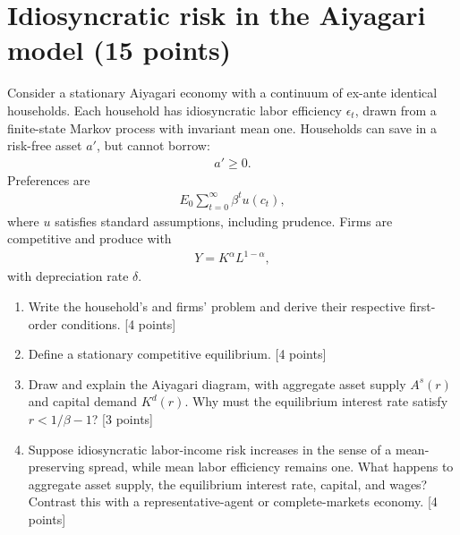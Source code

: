 \documentclass[11pt]{article}
\newcommand{\ben}{\begin{enumerate}}
\newcommand{\een}{\end{enumerate}}
\begin{document}
\section{Idiosyncratic risk in the Aiyagari model (15 points)}

Consider a stationary Aiyagari economy with a continuum of ex-ante identical households. Each household has idiosyncratic labor efficiency $\epsilon_t$, drawn from a finite-state Markov process with invariant mean one. Households can save in a risk-free asset $a'$, but cannot borrow:
\begin{eqnarray}
a'\geq 0.
\end{eqnarray}
Preferences are
\begin{eqnarray}
E_0\sum_{t=0}^{\infty}\beta^t u(c_t),
\end{eqnarray}
where $u$ satisfies standard assumptions, including prudence. Firms are competitive and produce with
\begin{eqnarray}
Y=K^\alpha L^{1-\alpha},
\end{eqnarray}
with depreciation rate $\delta$.

\ben
\item Write the household's and firms' problem and derive their respective first-order conditions. [4 points]

\item Define a stationary competitive equilibrium. [4 points]

\item Draw and explain the Aiyagari diagram, with aggregate asset supply $A^s(r)$ and capital demand $K^d(r)$. Why must the equilibrium interest rate satisfy $r<1/\beta-1$? [3 points]

\item Suppose idiosyncratic labor-income risk increases in the sense of a mean-preserving spread, while mean labor efficiency remains one. What happens to aggregate asset supply, the equilibrium interest rate, capital, and wages? Contrast this with a representative-agent or complete-markets economy. [4 points]
\een
\end{document}
